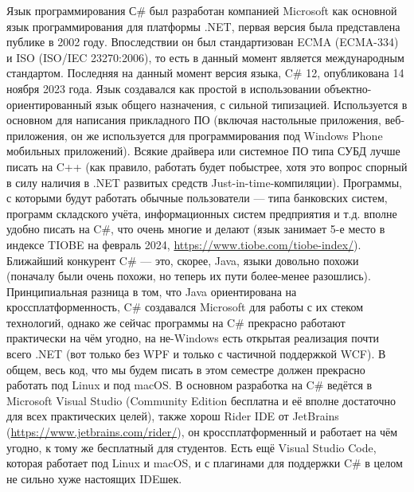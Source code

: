 \documentclass{../../text-style}
\begin{document}
Язык программирования С\# был разработан компанией Microsoft как основной язык программирования для платформы .NET, первая версия была представлена публике в 2002 году. Впоследствии он был стандартизован ECMA (ECMA-334) и ISO (ISO/IEC 23270:2006), то есть в данный момент является международным стандартом. Последняя на данный момент версия языка, C\# 12, опубликована  14 ноября 2023 года. Язык создавался как простой в использовании объектно-ориентированный язык общего назначения, с сильной типизацией. Используется в основном для написания прикладного ПО (включая настольные приложения, веб-приложения, он же используется для программирования под Windows Phone мобильных приложений). Всякие драйвера или системное ПО типа СУБД лучше писать на C++ (как правило, работать будет побыстрее, хотя это вопрос спорный в силу наличия в .NET развитых средств Just-in-time-компиляции). Программы, с которыми будут работать обычные пользователи --- типа банковских систем, программ складского учёта, информационных систем предприятия и т.д. вполне удобно писать на C\#, что очень многие и делают (язык занимает 5-е место в индексе TIOBE на февраль 2024, \url{https://www.tiobe.com/tiobe-index/}). Ближайший конкурент C\# --- это, скорее, Java, языки довольно похожи (поначалу были очень похожи, но теперь их пути более-менее разошлись). Принципиальная разница в том, что Java ориентирована на кроссплатформенность, C\# создавался Microsoft для работы с их стеком технологий, однако же сейчас программы на C\# прекрасно работают практически на чём угодно, на не-Windows есть открытая реализация почти всего .NET (вот только без WPF и только с частичной поддержкой WCF). В общем, весь код, что мы будем писать в этом семестре должен прекрасно работать под Linux и под macOS. В основном разработка на C\# ведётся в Microsoft Visual Studio (Community Edition бесплатна и её вполне достаточно для всех практических целей), также хорош Rider IDE от JetBrains (\url{https://www.jetbrains.com/rider/}), он кроссплатформенный и работает на чём угодно, к тому же бесплатный для студентов. Есть ещё Visual Studio Code, которая работает под Linux и macOS, и с плагинами для поддержки C\# в целом не сильно хуже настоящих IDEшек.
\end{document}
